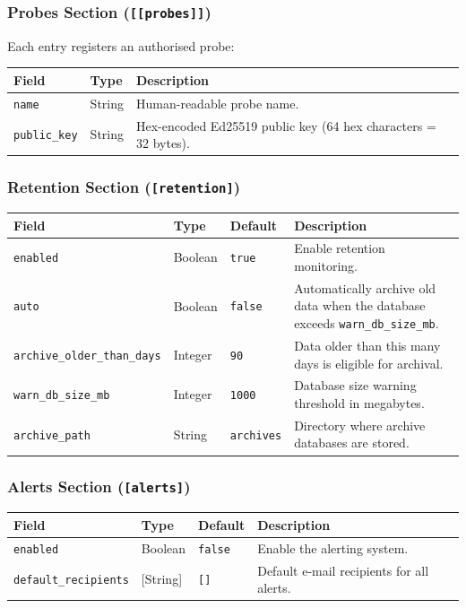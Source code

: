 \documentclass[12pt]{report}
\begin{document}
\subsubsection{Probes Section (\texttt{[[probes]]})}

Each entry registers an authorised probe:

\begin{longtable}{@{} l l p{7cm} @{}}
\toprule
\textbf{Field} & \textbf{Type} & \textbf{Description} \\
\midrule
\texttt{name} & String & Human-readable probe name. \\
\texttt{public\_key} & String & Hex-encoded Ed25519 public key (64
    hex characters = 32 bytes). \\
\bottomrule
\end{longtable}

\subsubsection{Retention Section (\texttt{[retention]})}

\begin{longtable}{@{} l l l p{4.5cm} @{}}
\toprule
\textbf{Field} & \textbf{Type} & \textbf{Default} & \textbf{Description} \\
\midrule
\texttt{enabled} & Boolean & \texttt{true} & Enable retention monitoring.
    \\
\texttt{auto} & Boolean & \texttt{false} & Automatically archive old
    data when the database exceeds \texttt{warn\_db\_size\_mb}. \\
\texttt{archive\_older\_than\_days} & Integer & \texttt{90} & Data older
    than this many days is eligible for archival. \\
\texttt{warn\_db\_size\_mb} & Integer & \texttt{1000} & Database size
    warning threshold in megabytes. \\
\texttt{archive\_path} & String & \texttt{archives} & Directory where
    archive databases are stored. \\
\bottomrule
\end{longtable}

\subsubsection{Alerts Section (\texttt{[alerts]})}

\begin{longtable}{@{} l l l p{4.5cm} @{}}
\toprule
\textbf{Field} & \textbf{Type} & \textbf{Default} & \textbf{Description} \\
\midrule
\texttt{enabled} & Boolean & \texttt{false} & Enable the alerting system. \\
\texttt{default\_recipients} & [String] & \texttt{[]} & Default e-mail
    recipients for all alerts. \\
\bottomrule
\end{longtable}
\end{document}
